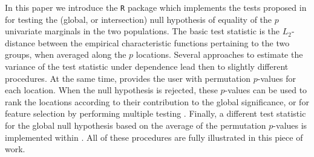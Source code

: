 In this paper we introduce the  \texttt{R} package which implements the tests proposed in \cite{Marta2} for testing the (global, or intersection) null hypothesis of equality of the $p$ univariate marginals
in the two populations. The basic test statistic is the $L_2$-distance between the empirical characteristic functions pertaining to the two groups, when averaged along the $p$ locations. Several approaches to estimate the variance of the test statistic under dependence lead then to slightly different procedures. At the same time,  provides the user with permutation $p$-values for each location. When the null hypothesis is rejected, these $p$-values can be used to rank the locations according to their contribution to the global significance, or for feature selection by performing multiple testing \citep{Dudoit2007}. Finally, a different test statistic for the global null hypothesis based on the average of the permutation $p$-values is implemented within . All of these procedures are fully illustrated in this piece of work.




